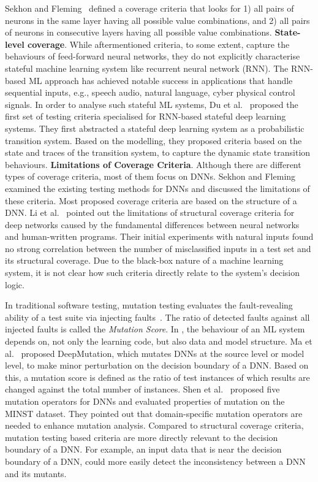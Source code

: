 Sekhon and Fleming~ defined a coverage criteria that looks for 1) all pairs of neurons in the same layer having all possible value combinations, and 2) all pairs of neurons in consecutive layers having all possible value combinations. 
\noindent \textbf{State-level coverage}.
While aftermentioned criteria, to some extent, capture the behaviours of feed-forward neural networks, they do not explicitly characterise stateful machine learning system like recurrent neural network (RNN).
The RNN-based ML approach has achieved notable success in applications that handle sequential inputs, e.g., speech audio, natural language, cyber physical control signals.
In order to analyse such stateful ML systems, Du et al.~ proposed the first set of testing criteria specialised for RNN-based stateful deep learning systems.
They first abstracted a stateful deep learning system as a probabilistic transition system. 
Based on the modelling, they proposed criteria based on the state and traces of the transition system, to capture the dynamic state transition behaviours.
\noindent\textbf{Limitations of Coverage Criteria}.
Although there are different types of coverage criteria, most of them focus on DNNs.
Sekhon and Fleming~ examined the existing testing methods for DNNs and discussed the limitations of these criteria.
Most proposed coverage criteria are based on the structure of a DNN. Li et al.~ pointed out the limitations of structural coverage criteria for deep networks caused by the fundamental differences
between neural networks and human-written programs.
Their initial experiments with natural inputs found no strong correlation between the number of misclassified
inputs in a test set and its structural coverage.
Due to the black-box nature of a machine learning system, it is not clear how such criteria directly relate to the system's decision logic.

In traditional software testing, mutation testing evaluates the fault-revealing ability of a test suite via injecting faults~. 
The ratio of detected faults against all injected faults is called the \emph{Mutation Score}.
In \mlt{}, the behaviour of an ML system depends on, not only the learning code, but also data and model structure.
Ma et al.~ proposed DeepMutation, which mutates DNNs at the source level or model level, to make minor perturbation on the decision boundary of a DNN.
Based on this, a mutation score is defined as the ratio of test instances of which results are changed against the total number of instances. 
Shen et al.~ proposed five mutation operators for DNNs and evaluated properties of mutation on the MINST dataset.
They pointed out that domain-specific mutation operators are needed to enhance mutation analysis.
Compared to structural coverage criteria, mutation testing based criteria are more directly relevant to the decision boundary of a DNN. For example, an input data that is near the decision boundary of a DNN, could more easily detect the inconsistency between a DNN and its mutants.

